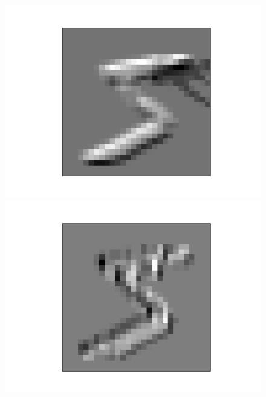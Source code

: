 \documentclass{article}
\begin{document}
\begin{figure}[h]
\begin{minipage}{0.2\linewidth}
		\includegraphics[width=\linewidth]{../graphics/mnist_5/conv_only/mnist_5_lower_edges.png}
	\end{minipage}
	\hfill
	\begin{minipage}{0.2\linewidth}
		\centering
		\includegraphics[width=\linewidth]{../graphics/mnist_5/conv_only/mnist_5_right_edges.png}
	\end{minipage}
\\
	\begin{minipage}{0.2\linewidth}
	\centering

\end{minipage}
\end{figure}
\end{document}
